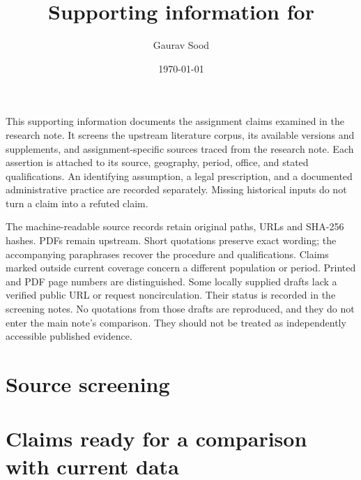 \documentclass[10pt]{article}
\title{Supporting information for\\\PaperTitle}
\author{Gaurav Sood}
\date{\today}
\begin{document}
\maketitle
This supporting information documents the assignment claims examined in the research note. It screens the upstream literature corpus, its available versions and supplements, and assignment-specific sources traced from the research note. Each assertion is attached to its source, geography, period, office, and stated qualifications. An identifying assumption, a legal prescription, and a documented administrative practice are recorded separately. Missing historical inputs do not turn a claim into a refuted claim.

The machine-readable source records retain original paths, URLs and SHA-256 hashes. PDFs remain upstream. Short quotations preserve exact wording; the accompanying paraphrases recover the procedure and qualifications. Claims marked outside current coverage concern a different population or period. Printed and PDF page numbers are distinguished.
Some locally supplied drafts lack a verified public URL or request noncirculation. Their status is recorded in the screening notes. No quotations from those drafts are reproduced, and they do not enter the main note's comparison. They should not be treated as independently accessible published evidence.
\section{Source screening}
\footnotesize\normalsize

\section{Claims ready for a comparison with current data}
\footnotesize\normalsize


\end{document}
